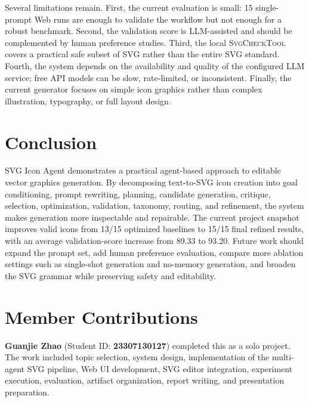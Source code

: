\documentclass[10pt]{article}
\newcommand{\tool}[1]{\textsc{#1}}
\newcommand{\project}{SVG Icon Agent}
\begin{document}
Several limitations remain.
First, the current evaluation is small: 15 single-prompt Web runs are enough to validate the workflow but not enough for a robust benchmark.
Second, the validation score is LLM-assisted and should be complemented by human preference studies.
Third, the local \tool{SvgCheckTool} covers a practical safe subset of SVG rather than the entire SVG standard.
Fourth, the system depends on the availability and quality of the configured LLM service; free API models can be slow, rate-limited, or inconsistent.
Finally, the current generator focuses on simple icon graphics rather than complex illustration, typography, or full layout design.

\section{Conclusion}

\project{} demonstrates a practical agent-based approach to editable vector graphics generation.
By decomposing text-to-SVG icon creation into goal conditioning, prompt rewriting, planning, candidate generation, critique, selection, optimization, validation, taxonomy, routing, and refinement, the system makes generation more inspectable and repairable.
The current project snapshot improves valid icons from 13/15 optimized baselines to 15/15 final refined results, with an average validation-score increase from 89.33 to 93.20.
Future work should expand the prompt set, add human preference evaluation, compare more ablation settings such as single-shot generation and no-memory generation, and broaden the SVG grammar while preserving safety and editability.

\section*{Member Contributions}

\textbf{Guanjie Zhao} (Student ID: \textbf{23307130127}) completed this as a solo project.
The work included topic selection, system design, implementation of the multi-agent SVG pipeline, Web UI development, SVG editor integration, experiment execution, evaluation, artifact organization, report writing, and presentation preparation.



\end{document}

